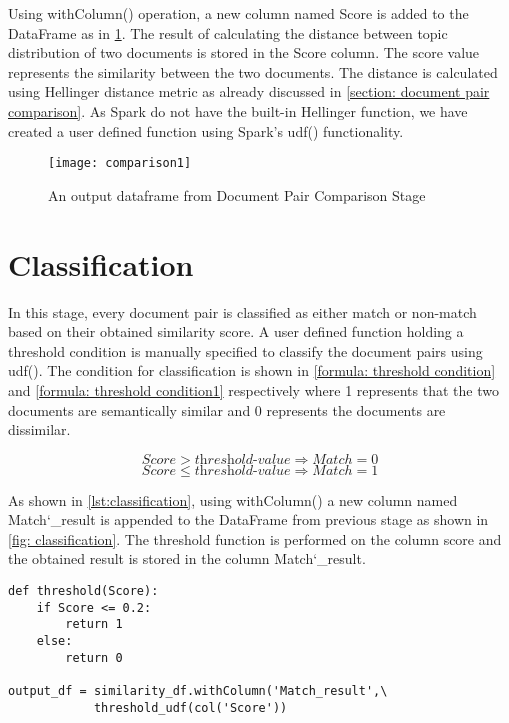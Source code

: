 \par Using withColumn() operation, a new column named Score is added to the DataFrame as in \ref{fig: comparison1}. The result of calculating the distance between topic distribution of two documents is stored in the Score column. The score value represents the similarity between the two documents. The distance is calculated using Hellinger distance metric as already discussed in \ref{section: document pair comparison}. As Spark do not have the built-in Hellinger function, we have created a user defined function using Spark's udf() functionality.  

\begin{figure}[htbp]
	\centering
		\texttt{[image: comparison1]}
	\caption{An output dataframe from Document Pair Comparison Stage }
	\label{fig: comparison1}
\end{figure}


\section{Classification}

In this stage, every document pair is classified as either match or non-match based on their obtained similarity score. A user defined function holding a threshold condition is manually specified to classify the document pairs using udf(). The condition for classification is shown in \ref{formula: threshold condition} and \ref{formula: threshold condition1} respectively where 1 represents that the two documents are semantically similar and 0 represents the documents are dissimilar.

\begin{equation}\label{formula: threshold condition}
\textit{Score}   >  \textit{threshold-value}  \Rightarrow Match = 0
\end{equation}
\begin{equation}\label{formula: threshold condition1}
\textit{Score}  \leq  \textit{threshold-value}  \Rightarrow Match = 1
\end{equation}


\par As shown in \ref{lst:classification}, using withColumn() a new column  named Match\char`_result is appended to the DataFrame from previous stage as shown in \ref{fig: classification}. The threshold function is performed on the column score and the obtained result is stored in the column Match\char`_result.

\begin{lstlisting}[style=Java,float=htb,caption={Python code to classify Documents along with threshold condition},label={lst:classification}]
def threshold(Score):
    if Score <= 0.2:
        return 1
    else:
        return 0
        
output_df = similarity_df.withColumn('Match_result',\
			threshold_udf(col('Score'))
\end{lstlisting}

